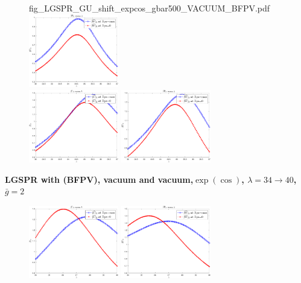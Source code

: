 \documentclass[11pt]{article}
\begin{document}
\begin{figure}[H]
{		{fig_LGSPR_GU_shift_expcos_gbar500_VACUUM_BFPV.pdf}}
	\quad
	\subfigure 
	{\includegraphics[width=0.35\textwidth]
		{fig_LGSPR_GW_shift_expcos_gbar500_VACUUM_BFPV.pdf}}
	\\
	\subfigure 
	{\includegraphics[width=0.35\textwidth]
		{fig_LGSPR_GU_shift_expcos_gbar1000_VACUUM_BFPV.pdf}}
	\quad
	\subfigure 
	{\includegraphics[width=0.35\textwidth]
		{fig_LGSPR_GW_shift_expcos_gbar1000_VACUUM_BFPV.pdf}}
\end{figure}

\noindent\textbf{\large LGSPR  with (BFPV), vacuum and vacuum,\quad $\exp(\cos)$, \quad $\lambda=34 \to 40$, \quad $\bar{g} =2$}
\begin{figure}[H]
	\centering
	\subfigure 
	{\includegraphics[width=0.35\textwidth]
		{fig_LGSPR_GU_shift_expcos_gbar2000_VACUUM_BFPV.pdf}}
	\quad
	\subfigure 
	{\includegraphics[width=0.35\textwidth]
		{fig_LGSPR_GW_shift_expcos_gbar2000_VACUUM_BFPV.pdf}}
\end{figure}
\end{document}
